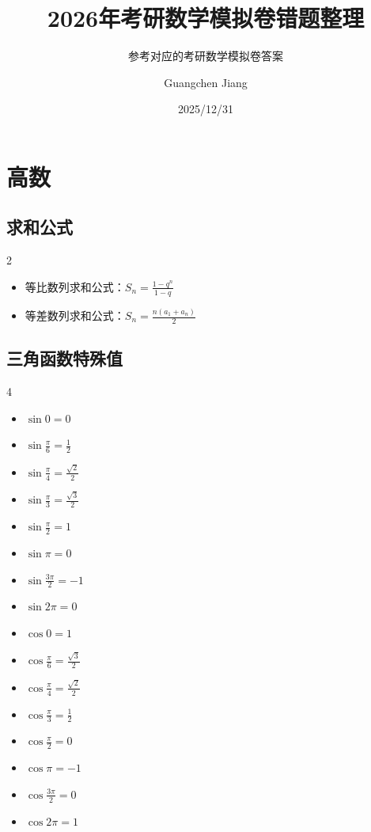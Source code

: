 \documentclass[lang=cn,math=mtpro2,10pt,scheme=chinese,black]{elegantbook}
\title{2026年考研数学模拟卷错题整理}
\subtitle{参考对应的考研数学模拟卷答案}
\author{Guangchen Jiang}
\date{2025/12/31}
\begin{document}
\chapter{高数}

\section{求和公式}

\begin{multicols}{2}
  \begin{itemize}
        \item 等比数列求和公式：\(\displaystyle S_n = \frac{1 - q^n}{1 - q}\)
        \item 等差数列求和公式：\(\displaystyle S_n = \frac{n \left(a_1 + a_n\right)}{2}\)
    \end{itemize}
\end{multicols}

\section{三角函数特殊值}

\begin{multicols}{4}
\begin{itemize}
  \item \( \displaystyle \sin 0 = 0 \)
  \item \( \displaystyle \sin \frac{\pi}{6} = \frac{1}{2} \)
  \item \( \displaystyle \sin \frac{\pi}{4} = \frac{\sqrt{2}}{2} \)
  \item \( \displaystyle \sin \frac{\pi}{3} = \frac{\sqrt{3}}{2} \)
  \item \( \displaystyle \sin \frac{\pi}{2} = 1 \)
  \item \( \displaystyle \sin \pi = 0 \)
  \item \( \displaystyle \sin \frac{3\pi}{2} = -1 \)
  \item \( \displaystyle \sin 2\pi = 0 \)
  \item \( \displaystyle \cos 0 = 1 \)
  \item \( \displaystyle \cos \frac{\pi}{6} = \frac{\sqrt{3}}{2} \)
  \item \( \displaystyle \cos \frac{\pi}{4} = \frac{\sqrt{2}}{2} \)
  \item \( \displaystyle \cos \frac{\pi}{3} = \frac{1}{2} \)
  \item \( \displaystyle \cos \frac{\pi}{2} = 0 \)
  \item \( \displaystyle \cos \pi = -1 \)
  \item \( \displaystyle \cos \frac{3\pi}{2} = 0 \)
  \item \( \displaystyle \cos 2\pi = 1 \)
\end{itemize}
\end{multicols}
\end{document}
